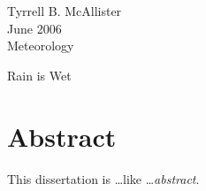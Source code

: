 {\singlespacing
   \begin{flushright}
      Tyrrell B. McAllister \\
      June 2006 \\
      Meteorology \\
   \end{flushright}
}

\bigskip

\begin{center}
   Rain is Wet \\
\end{center}

\section*{Abstract}

This dissertation is \ldots like \ldots \emph{abstract}.
